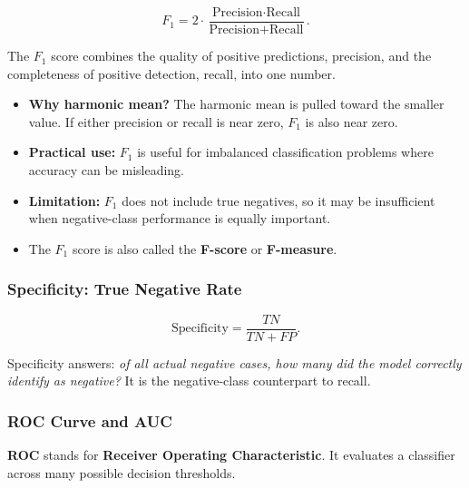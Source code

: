 \documentclass[12pt,openany]{book}
\begin{document}
\begin{equation*}
    F_1
    = 2\cdot\frac{\text{Precision}\cdot\text{Recall}}
    {\text{Precision}+\text{Recall}}.
\end{equation*}

The \(F_1\) score combines the quality of positive predictions, precision, and the completeness of positive detection, recall, into one number.

\begin{itemize}[leftmargin=*]
    \item \textbf{Why harmonic mean?} The harmonic mean is pulled toward the smaller value. If either precision or recall is near zero, \(F_1\) is also near zero.
    \item \textbf{Practical use:} \(F_1\) is useful for imbalanced classification problems where accuracy can be misleading.
    \item \textbf{Limitation:} \(F_1\) does not include true negatives, so it may be insufficient when negative-class performance is equally important.
    \item The \(F_1\) score is also called the \textbf{F-score} or \textbf{F-measure}.
\end{itemize}

\subsubsection{Specificity: True Negative Rate}

\begin{equation*}
    \text{Specificity} = \frac{TN}{TN+FP}.
\end{equation*}

Specificity answers: \textit{of all actual negative cases, how many did the model correctly identify as negative?} It is the negative-class counterpart to recall.

\subsubsection{ROC Curve and AUC}

\textbf{ROC} stands for \textbf{Receiver Operating Characteristic}. It evaluates a classifier across many possible decision thresholds.
\end{document}

